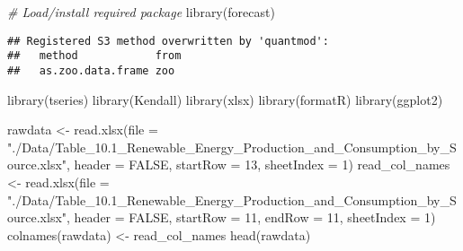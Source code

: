 \documentclass[
]{article}
\newenvironment{Shaded}{\begin{snugshade}}{\end{snugshade}}
\newcommand{\AttributeTok}[1]{\textcolor[rgb]{0.77,0.63,0.00}{#1}}
\newcommand{\CommentTok}[1]{\textcolor[rgb]{0.56,0.35,0.01}{\textit{#1}}}
\newcommand{\ConstantTok}[1]{\textcolor[rgb]{0.00,0.00,0.00}{#1}}
\newcommand{\DecValTok}[1]{\textcolor[rgb]{0.00,0.00,0.81}{#1}}
\newcommand{\FunctionTok}[1]{\textcolor[rgb]{0.00,0.00,0.00}{#1}}
\newcommand{\NormalTok}[1]{#1}
\newcommand{\OtherTok}[1]{\textcolor[rgb]{0.56,0.35,0.01}{#1}}
\newcommand{\StringTok}[1]{\textcolor[rgb]{0.31,0.60,0.02}{#1}}
\begin{document}
\begin{Shaded}
\begin{Highlighting}[]
\CommentTok{\# Load/install required package}
\FunctionTok{library}\NormalTok{(forecast)}
\end{Highlighting}
\end{Shaded}

\begin{verbatim}
## Registered S3 method overwritten by 'quantmod':
##   method            from
##   as.zoo.data.frame zoo
\end{verbatim}

\begin{Shaded}
\begin{Highlighting}[]
\FunctionTok{library}\NormalTok{(tseries)}
\FunctionTok{library}\NormalTok{(Kendall)}
\FunctionTok{library}\NormalTok{(xlsx)}
\FunctionTok{library}\NormalTok{(formatR)}
\FunctionTok{library}\NormalTok{(ggplot2)}
\end{Highlighting}
\end{Shaded}

\begin{Shaded}
\begin{Highlighting}[]
\NormalTok{rawdata }\OtherTok{\textless{}{-}} \FunctionTok{read.xlsx}\NormalTok{(}\AttributeTok{file =} \StringTok{"./Data/Table\_10.1\_Renewable\_Energy\_Production\_and\_Consumption\_by\_Source.xlsx"}\NormalTok{,}
    \AttributeTok{header =} \ConstantTok{FALSE}\NormalTok{, }\AttributeTok{startRow =} \DecValTok{13}\NormalTok{, }\AttributeTok{sheetIndex =} \DecValTok{1}\NormalTok{)}
\NormalTok{read\_col\_names }\OtherTok{\textless{}{-}} \FunctionTok{read.xlsx}\NormalTok{(}\AttributeTok{file =} \StringTok{"./Data/Table\_10.1\_Renewable\_Energy\_Production\_and\_Consumption\_by\_Source.xlsx"}\NormalTok{,}
    \AttributeTok{header =} \ConstantTok{FALSE}\NormalTok{, }\AttributeTok{startRow =} \DecValTok{11}\NormalTok{, }\AttributeTok{endRow =} \DecValTok{11}\NormalTok{, }\AttributeTok{sheetIndex =} \DecValTok{1}\NormalTok{)}
\FunctionTok{colnames}\NormalTok{(rawdata) }\OtherTok{\textless{}{-}}\NormalTok{ read\_col\_names}
\FunctionTok{head}\NormalTok{(rawdata)}
\end{Highlighting}
\end{Shaded}
\end{document}
